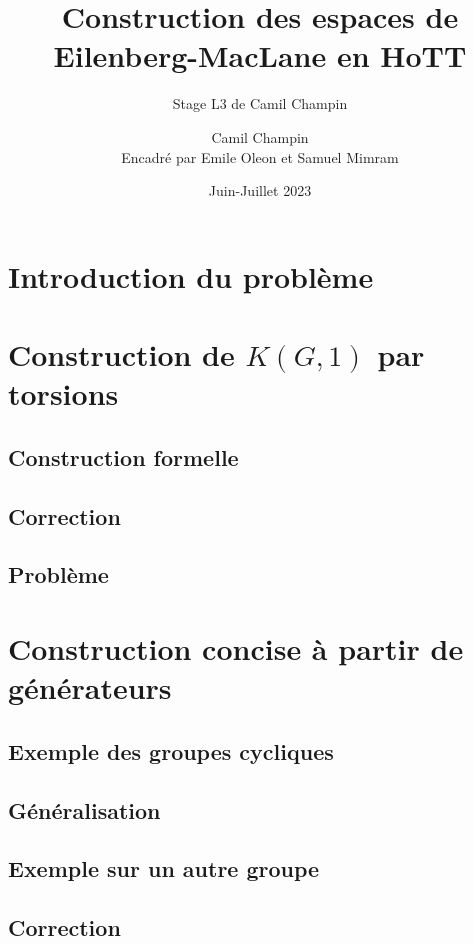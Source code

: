 \documentclass{article}
\title{Construction des espaces de Eilenberg-MacLane en HoTT}
\author{Stage L3 de Camil Champin}
\author{Camil Champin\\[1ex]
\small Encadré par Emile Oleon et Samuel Mimram}  %
\date{Juin-Juillet 2023}
\begin{document}
\maketitle

\section{Introduction du problème}


\section{Construction de $K(G,1)$ par torsions}

\subsection{Construction formelle}
\subsection{Correction}
\subsection{Problème}

\section{Construction concise à partir de générateurs}

\subsection{Exemple des groupes cycliques}
\subsection{Généralisation}
\subsection{Exemple sur un autre groupe} %
\subsection{Correction}
\end{document}
